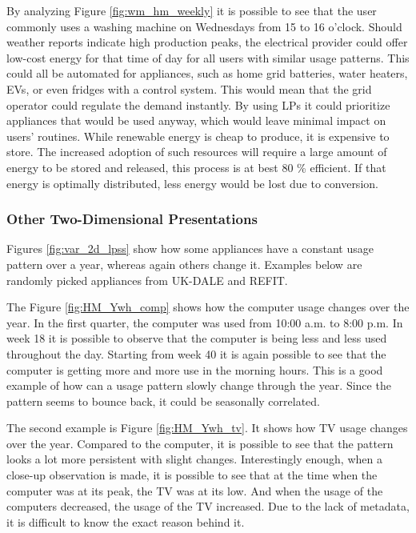 By analyzing Figure \ref{fig:wm_hm_weekly} it is possible to see that the user commonly uses a washing machine on Wednesdays from 15 to 16 o'clock. 
Should weather reports indicate high production peaks, the electrical provider could offer low-cost energy for that time of day for all users with similar usage patterns. 
This could all be automated for appliances, such as home grid batteries, water heaters, EVs, or even fridges with a control system.
This would mean that the grid operator could regulate the demand instantly.
By using LPs it could prioritize appliances that would be used anyway, which would leave minimal impact on users' routines. 
While renewable energy is cheap to produce, it is expensive to store.
The increased adoption of such resources will require a large amount of energy to be stored and released, this process is at best 80 \% efficient.
If that energy is optimally distributed, less energy would be lost due to conversion.

\subsubsection{Other Two-Dimensional Presentations}

Figures \ref{fig:var_2d_lpss} show how some appliances have a constant usage pattern over a year, whereas again others change it. 
Examples below are randomly picked appliances from UK-DALE and REFIT. 

The Figure \ref{fig:HM_Ywh_comp} shows how the computer usage changes over the year.
In the first quarter, the computer was used from 10:00 a.m. to 8:00 p.m.
In week 18 it is possible to observe that the computer is being less and less used throughout the day. 
Starting from week 40 it is again possible to see that the computer is getting more and more use in the morning hours. 
This is a good example of how can a usage pattern slowly change through the year. 
Since the pattern seems to bounce back, it could be seasonally correlated. 

The second example is Figure \ref{fig:HM_Ywh_tv}. It shows how TV usage changes over the year.
Compared to the computer, it is possible to see that the pattern looks a lot more persistent with slight changes.
Interestingly enough, when a close-up observation is made, it is possible to see that at the time when the computer was at its peak,
the TV was at its low. And when the usage of the computers decreased, the usage of the TV increased. 
Due to the lack of metadata, it is difficult to know the exact reason behind it. 

